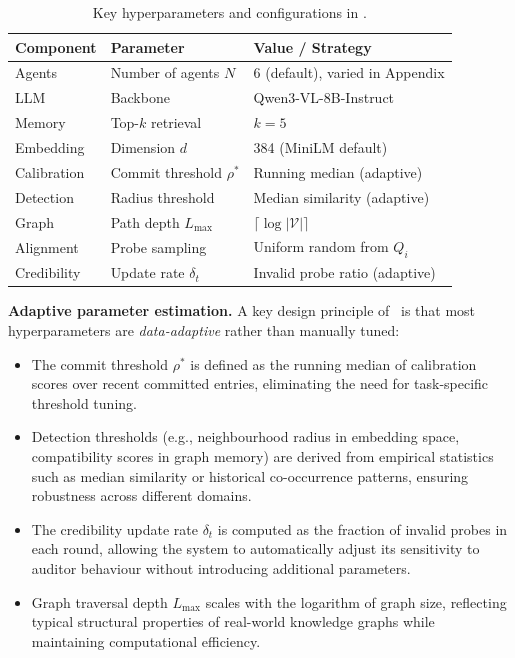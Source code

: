 \begin{table}[h]
\centering
\small
\caption{Key hyperparameters and configurations
  in \system.}
\label{tab:hyperparams}
\begin{tabular}{l|l|l}
\toprule
\textbf{Component} & \textbf{Parameter}
  & \textbf{Value / Strategy} \\
\midrule
Agents & Number of agents $N$
  & 6 (default), varied in Appendix \\
LLM & Backbone
  & Qwen3-VL-8B-Instruct \\
Memory & Top-$k$ retrieval
  & $k = 5$ \\
Embedding & Dimension $d$
  & 384 (MiniLM default) \\
\midrule
Calibration & Commit threshold $\rho^*$
  & Running median (adaptive) \\
Detection & Radius threshold
  & Median similarity (adaptive) \\
Graph & Path depth $L_{\max}$
  & $\lceil \log |\mathcal{V}| \rceil$ \\
Alignment & Probe sampling
  & Uniform random from $Q_i$ \\
Credibility & Update rate $\delta_t$
  & Invalid probe ratio (adaptive) \\
\bottomrule
\end{tabular}
\end{table}

\medskip
\textbf{Adaptive parameter estimation.}
A key design principle of \system\ is that most
hyperparameters are \emph{data-adaptive} rather than
manually tuned:

\begin{itemize}
    \item The commit threshold $\rho^*$ is defined as
    the running median of calibration scores over
    recent committed entries, eliminating the need
    for task-specific threshold tuning.

    \item Detection thresholds (e.g., neighbourhood
    radius in embedding space, compatibility scores
    in graph memory) are derived from empirical
    statistics such as median similarity or historical
    co-occurrence patterns, ensuring robustness across
    different domains.

    \item The credibility update rate $\delta_t$ is
    computed as the fraction of invalid probes in each
    round, allowing the system to automatically adjust
    its sensitivity to auditor behaviour without
    introducing additional parameters.

    \item Graph traversal depth $L_{\max}$ scales with
    the logarithm of graph size, reflecting typical
    structural properties of real-world knowledge
    graphs while maintaining computational efficiency.
\end{itemize}

